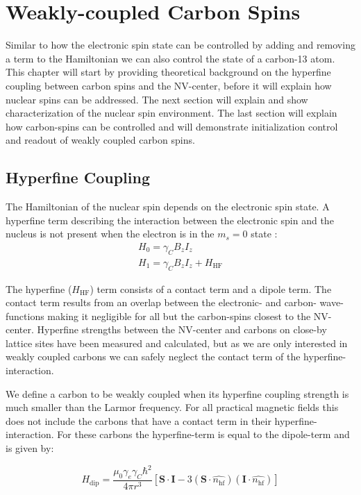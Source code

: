 
\chapter{Weakly-coupled Carbon Spins}
Similar to how the electronic spin state can be controlled by adding and removing a term to the Hamiltonian we can also control the state of a carbon-13 atom.
This chapter will start by providing theoretical background on the hyperfine coupling between carbon spins and the NV-center, before it will explain how nuclear spins can be addressed.
The next section will explain and show characterization of the nuclear spin environment.
The last section will explain how carbon-spins can be controlled and will demonstrate initialization control and readout of weakly coupled carbon spins.
\section{Hyperfine Coupling}
The Hamiltonian of the nuclear spin depends on the electronic spin state\citep{Taminiau2014Universal}.
A hyperfine term describing the interaction between the electronic spin and the nucleus is not present when the electron is in the $m_s = 0$ state :
 \begin{eqnarray}
H_0= \gamma_C B_z I_z \\
H_1 = \gamma_C B_z I_z +H_{\mathrm{HF}}
\end{eqnarray}

The hyperfine ($H_{\mathrm{HF}}$) term consists of a contact term and a dipole term.
The contact term results from an overlap between the electronic- and carbon- wave-functions making it negligible for all but the carbon-spins closest to the NV- center.
Hyperfine strengths between the NV-center and carbons on close-by lattice sites have been measured\citep{Smeltzer201113} and calculated\citep{Gali2008Ab,Gali2009Identification}, but as we are only interested in weakly coupled carbons we can safely neglect the contact term of the hyperfine-interaction.

We define a carbon to be weakly coupled when its hyperfine coupling strength is much smaller than the Larmor frequency.
For all practical magnetic fields this does not include the carbons that have a contact term in their hyperfine-interaction.
For these carbons the hyperfine-term is equal to the dipole-term and is given by\citep{Lange2012Quantum}:

\begin{equation}
H_{\mathrm{dip}} = \frac{\mu_0 \gamma_e \gamma_C \hbar^2 }{4 \pi r^3} [ \bm{S \cdot I} - 3 (\bm S \cdot \hat{n_{\mathrm{hf}}})(\bm I \cdot \hat{n_{\mathrm{hf}}})]
\end{equation}

